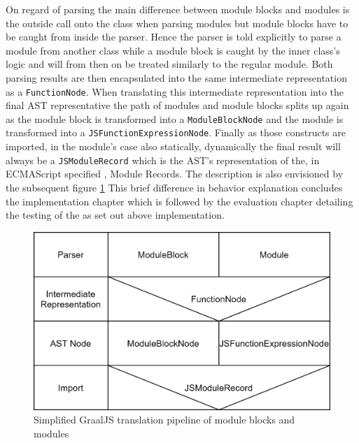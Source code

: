 On regard of parsing the main difference between module blocks and modules is the outside call onto the class when parsing modules but module blocks have to be caught from inside the parser. Hence the parser is told explicitly to parse a module from another class while a module block is caught by the inner class's logic and will from then on be treated similarly to the regular module. Both parsing results are then encapsulated into the same intermediate representation as a \texttt{FunctionNode}. When translating this intermediate representation into the final AST representative the path of modules and module blocks splits up again as the module block is transformed into a \texttt{ModuleBlockNode} and the module is transformed into a \texttt{JSFunctionExpressionNode}. Finally as those constructs are imported, in the module's case also statically, dynamically the final result will always be a \texttt{JSModuleRecord} which is the AST's representation of the, in ECMAScript specified \cite{ecma}, Module Records. The description is also envisioned by the subsequent figure \ref{fig:blockVSmodule} This brief difference in behavior explanation concludes the implementation chapter which is followed by the evaluation chapter detailing the testing of the as set out above implementation.

\begin{figure}[h!]
    \centering
    \includegraphics[scale=0.165]{figures/ModuleBlockVSModule.png}
    \caption{Simplified GraalJS translation pipeline of module blocks and modules}
    \label{fig:blockVSmodule}
\end{figure}